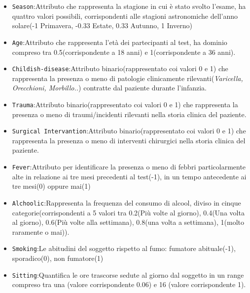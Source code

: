   \begin{itemize}
  	\item \texttt{Season}:Attributo che rappresenta la stagione in cui è stato svolto l'esame, ha quattro valori possibili, corrispondenti alle stagioni astronomiche dell'anno solare(-1 Primavera, -0.33 Estate, 0.33 Autunno, 1 Inverno)
  	
  	\item \texttt{Age}:Attributo che rappresenta l'età dei partecipanti al test, ha dominio compreso tra 0.5(corrispondente a 18 anni) e 1(corrispondente a 36 anni).
  	
  	\item \texttt{Childish-disease}:Attributo binario(rappresentato coi valori 0 e 1) che rappresenta la presenza o meno di patologie clinicamente rilevanti(\textit{Varicella, Orecchioni, Morbillo..}) contratte dal paziente durante l'infanzia.
  
  	\item \texttt{Trauma}:Attributo binario(rappresentato coi valori 0 e 1) che rappresenta la presenza o meno di traumi/incidenti rilevanti nella storia clinica del paziente.	
  	
  	\item \texttt{Surgical Intervantion}:Attributo binario(rappresentato coi valori 0 e 1) che rappresenta la presenza o meno di interventi chirurgici nella storia clinica del paziente.
  	
  	\item \texttt{Fever}:Attributo per identificare la presenza o meno di febbri particolarmente alte in relazione ai tre mesi precedenti al test(-1), in un tempo antecedente ai tre mesi(0) oppure mai(1)
  	
  	\item \texttt{Alchoolic}:Rappresenta la frequenza del consumo di alcool, diviso in cinque categorie(corrispondenti a 5 valori tra 0.2(Più volte al giorno), 0.4(Una volta al giorno), 0.6(Più volte alla settimana), 0.8(una volta a settimana), 1(molto raramente o mai)).
  	
  	\item \texttt{Smoking}:Le abitudini del soggetto rispetto al fumo: fumatore abituale(-1), sporadico(0), non fumatore(1)
  	
  	\item \texttt{Sitting}:Quantifica le ore trascorse sedute al giorno dal soggetto in un range compreso tra una (valore corrispondente 0.06) e 16 (valore corrispondente 1).
  	
  \end{itemize} 

